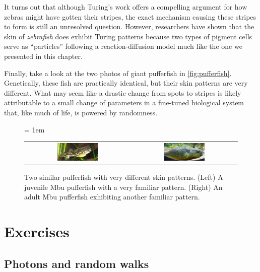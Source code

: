 It turns out that although Turing's work offers a compelling argument for how zebras might have gotten their stripes, the exact mechanism causing these stripes to form is still an unresolved question. However, researchers have shown that the skin of \textit{zebrafish} does exhibit Turing patterns because two types of pigment cells serve as ``particles'' following a reaction-diffusion model much like the one we presented in this chapter.

Finally, take a look at the two photos of giant pufferfish in \autoref{fig:pufferfish}. Genetically, these fish are practically identical, but their skin patterns are very different. What may seem like a drastic change from spots to stripes is likely attributable to a small change of parameters in a fine-tuned biological system that, like much of life, is powered by randomness.\\

\begin{figure}[h]
\centering
\mySfFamily
\tabcolsep = 1em
\begin{tabular}{c c}
\includegraphics[width = 0.4\textwidth]{../images/Juvenile_Mbu_pufferfish.jpg} & \includegraphics[width = 0.4\textwidth]{../images/Giant_Puffer_fish_skin_pattern.jpg}
\end{tabular}
\caption{Two similar pufferfish with very different skin patterns. (Left) A juvenile Mbu pufferfish with a very familiar pattern. (Right) An adult Mbu pufferfish exhibiting another familiar pattern.}
\label{fig:pufferfish}
\end{figure}

\FloatBarrier
{}
\newpage
\section{Exercises}

\subsection{Photons and random walks}

